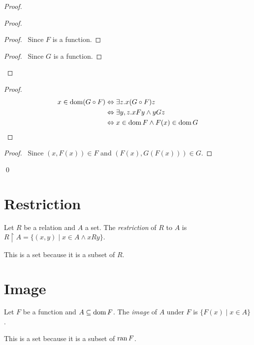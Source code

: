 \begin{proof}
    \pf
    \begin{proof}
        \begin{proof}
            \pf\ Since $F$ is a function.
        \end{proof}
        \begin{proof}
            \pf\ Since $G$ is a function.
        \end{proof}
    \end{proof}
    \begin{proof}
        \pf
        \begin{align*}
            x \in \operatorname{dom} (G \circ F) & \Leftrightarrow \exists z. x(G \circ F)z \\
            & \Leftrightarrow \exists y, z. xFy \wedge yGz \\
            & \Leftrightarrow x \in \operatorname{dom} F \wedge F(x) \in \operatorname{dom} G
        \end{align*}
    \end{proof}
    \begin{proof}
        \pf\ Since $(x,F(x)) \in F$ and $(F(x),G(F(x))) \in G$.
    \end{proof}
    \qed
\end{proof}
\section{Restriction}

\begin{definition}
    Let $R$ be a relation and $A$ a set. The \emph{restriction} of $R$ to $A$
    is $R \restriction A = \{ (x,y) \mid x \in A \wedge xRy \}$.

    This is a set because it is a subset of $R$.
\end{definition}

\section{Image}

\begin{definition}
    Let $F$ be a function and $A \subseteq \operatorname{dom} F$. The \emph{image} of $A$
    under $F$ is $\{ F(x) \mid x \in A \}$.

    This is a set because it is a subset of $\operatorname{ran} F$.
\end{definition}

